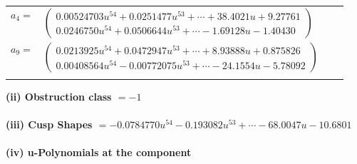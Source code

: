 \documentclass[1p]{elsarticle_modified}
\theoremstyle{definition}
\begin{document}
\begin{tabular}{m{7pt} m{180pt} m{7pt} m{180pt} }
\flushright $a_{4}=$&$\begin{pmatrix}0.00524703 u^{54}+0.0251477 u^{53}+\cdots+38.4021 u+9.27761\\0.0246750 u^{54}+0.0506644 u^{53}+\cdots-1.69128 u-1.40430\end{pmatrix}$ \\
\flushright $a_{9}=$&$\begin{pmatrix}0.0213925 u^{54}+0.0472947 u^{53}+\cdots+8.93888 u+0.875826\\0.00408564 u^{54}-0.00772075 u^{53}+\cdots-24.1554 u-5.78092\end{pmatrix}$\\&\end{tabular}
\flushleft \textbf{(ii) Obstruction class $= -1$}\\~\\
\flushleft \textbf{(iii) Cusp Shapes $= -0.0784770 u^{54}-0.193082 u^{53}+\cdots-68.0047 u-10.6801$}\\~\\
\newpage\renewcommand{\arraystretch}{1}
\flushleft \textbf{(iv) u-Polynomials at the component}\newline \\
\end{document}
